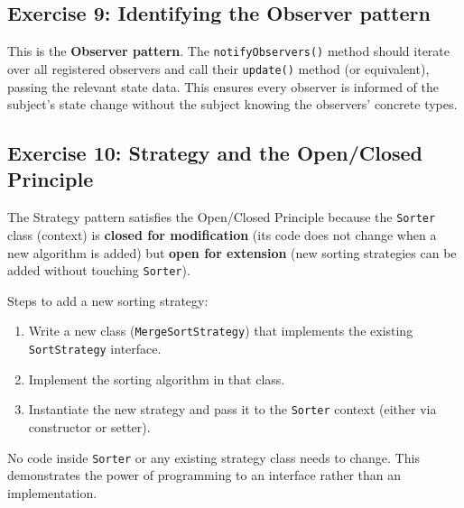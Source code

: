 \documentclass[twoside=false,DIV=14]{scrartcl}
\begin{document}
\subsection*{Exercise 9: Identifying the Observer pattern}

This is the \textbf{Observer pattern}.  The \texttt{notifyObservers()} method should iterate over all registered observers and call their \texttt{update()} method (or equivalent), passing the relevant state data.  This ensures every observer is informed of the subject's state change without the subject knowing the observers' concrete types.

\subsection*{Exercise 10: Strategy and the Open/Closed Principle}

The Strategy pattern satisfies the Open/Closed Principle because the \texttt{Sorter} class (context) is \textbf{closed for modification} (its code does not change when a new algorithm is added) but \textbf{open for extension} (new sorting strategies can be added without touching \texttt{Sorter}).

Steps to add a new sorting strategy:
\begin{enumerate}
    \item Write a new class (\texttt{MergeSortStrategy}) that implements the existing \texttt{SortStrategy} interface.
    \item Implement the sorting algorithm in that class.
    \item Instantiate the new strategy and pass it to the \texttt{Sorter} context (either via constructor or setter).
\end{enumerate}
No code inside \texttt{Sorter} or any existing strategy class needs to change.  This demonstrates the power of programming to an interface rather than an implementation.
\end{document}
